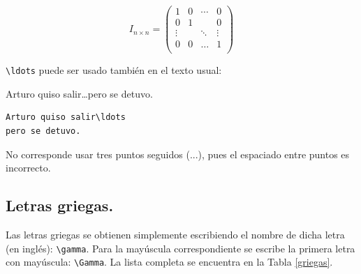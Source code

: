 \begin{enumerate}
$$
I_{n\times n} = \left( \begin{array}{cccc}
                                                1&0& \cdots & 0\\
                                                0&1& &0 \\
                                                \vdots& &\ddots &\vdots\\
                                                0&0&\ldots& 1\\
                                                \end{array} \right)  
$$

\verb+\ldots+ puede ser usado tambi{\'e}n en el texto usual:

\vspace{.3cm}
{\small
\begin{minipage}[t]{5cm}
Arturo quiso salir\ldots pero se detuvo.
\end{minipage}
\hspace{2cm}
\begin{minipage}[t]{5cm}
\begin{verbatim}
Arturo quiso salir\ldots 
pero se detuvo.
\end{verbatim}
\end{minipage}
}
\vspace{.3cm}
\end{enumerate}


No corresponde usar tres puntos seguidos (...), pues el espaciado
entre puntos es incorrecto.

\subsection{Letras griegas.} 

Las letras griegas se obtienen simplemente escribiendo el nombre de
dicha letra (en ingl{\'e}s): \verb+\gamma+. Para la may{\'u}scula correspondiente
se escribe la primera letra con may{\'u}scula: \verb+\Gamma+. La lista completa
se encuentra en la Tabla \ref{griegas}.

